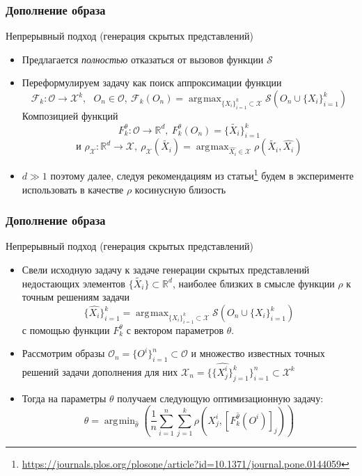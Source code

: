 \documentclass[10pt]{beamer}
\DeclareMathOperator*{\argmax}{\arg\!\max}
\DeclareMathOperator*{\argmin}{\arg\!\min}
\begin{document}
\begin{frame}
	\frametitle{Дополнение образа}
	\begin{block}{Непрерывный подход (генерация скрытых представлений)}
		\begin{itemize}
			\item Предлагается \textit{полностью} отказаться от вызовов функции $\mathcal{S}$
			\item Переформулируем задачу как поиск аппроксимации функции 
			$$\mathcal{F}_k: \mathcal{O}\longrightarrow \mathcal{X}^k, ~~~O_n\in \mathcal{O},~ \mathcal{F}_k(O_n) = \argmax_{\{X_i\}_{i=1}^k\subset\mathcal{X}} \mathcal{S}\left(O_n\cup\{X_i\}_{i=1}^k\right)$$
			Композицией функций 
			$$F_k^\theta: \mathcal{O}\longrightarrow \mathbb{R}^d, ~F_k^\theta(O_n) = \{\tilde{X_i}\}_{i=1}^k$$
			$$\text{и }\rho_\mathcal{X}: \mathbb{R}^d\longrightarrow \mathcal{X}, ~ \rho_\mathcal{X}(\tilde{X_i}) = \argmax_{\hat{X_i}\in\mathcal{X}}\rho(\tilde{X_i}, \hat{X_i})$$
			\item $d \gg 1$ поэтому далее, следуя рекомендациям из статьи\footnote{\url{https://journals.plos.org/plosone/article?id=10.1371/journal.pone.0144059}} будем в эксперименте использовать в качестве $\rho$ косинусную близость
		\end{itemize}
	\end{block}
\end{frame}


\begin{frame}
	\frametitle{Дополнение образа}
	\begin{block}{Непрерывный подход (генерация скрытых представлений)}
		\begin{itemize}
			\item Свели исходную задачу к задаче генерации скрытых представлений недостающих элементов $\{\tilde{X_i}\}\subset \mathbb{R}^d$, наиболее близких в смысле функции $\rho$ к точным решениям задачи
			$$\{\hat{X_i}\}_{i=1}^k= \argmax_{\{X_i\}_{i=1}^k\subset\mathcal{X}} \mathcal{S}\left(O_n\cup\{X_i\}_{i=1}^k\right)$$
			с помощью функции  $F_k^\theta$ с вектором параметров $\theta$. 
			\item Рассмотрим образы $\mathcal{O}_n = \{O^i\}_{i=1}^n \subset\mathcal{O}$ и множество известных точных решений задачи дополнения для них $\mathcal{X}_n =\{\{\hat{X_j^i}\}_{j=1}^k\}_{i=1}^n\subset\mathcal{X}^k$
			\item Тогда на параметры $\theta$ получаем следующую оптимизационную задачу:
			$$\theta = \argmin_{\hat{\theta}}\left( \frac{1}{n}\sum_{i=1}^n\sum_{j=1}^k\rho\left(X_j^i, [F_k^{\hat{\theta}}(O^i)]_j\right)\right)$$
		\end{itemize}
\end{block}
\end{frame}
\end{document}
